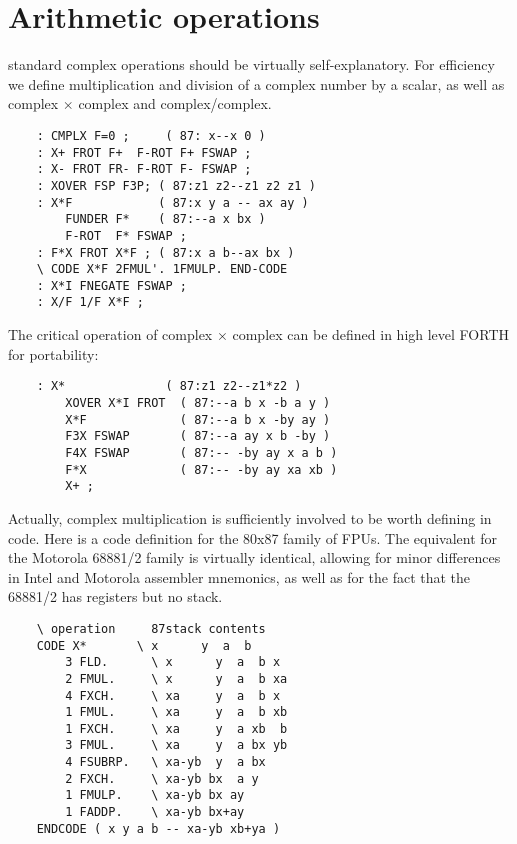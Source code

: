 \section{Arithmetic operations}
 standard complex operations should be virtually self-explanatory. For efficiency we define multiplication and division of a complex number by a scalar, as well as complex $\times$ complex and complex/complex.

\begin{lstlisting}
    : CMPLX F=0 ;     ( 87: x--x 0 )
    : X+ FROT F+  F-ROT F+ FSWAP ;
    : X- FROT FR- F-ROT F- FSWAP ;
    : XOVER FSP F3P; ( 87:z1 z2--z1 z2 z1 )
    : X*F            ( 87:x y a -- ax ay )
        FUNDER F*    ( 87:--a x bx )
        F-ROT  F* FSWAP ;
    : F*X FROT X*F ; ( 87:x a b--ax bx )
    \ CODE X*F 2FMUL'. 1FMULP. END-CODE
    : X*I FNEGATE FSWAP ;
    : X/F 1/F X*F ;
\end{lstlisting}

The critical operation of complex $\times$ complex can be defined in high level FORTH for portability:

\begin{lstlisting}
    : X*              ( 87:z1 z2--z1*z2 )
        XOVER X*I FROT  ( 87:--a b x -b a y )
        X*F             ( 87:--a b x -by ay )
        F3X FSWAP       ( 87:--a ay x b -by )
        F4X FSWAP       ( 87:-- -by ay x a b )
        F*X             ( 87:-- -by ay xa xb )
        X+ ;
\end{lstlisting}

Actually, complex multiplication is sufficiently involved to be worth defining in code. Here is a code definition for the 80x87 family of FPUs. The equivalent for the Motorola 68881/2 family is virtually identical, allowing for minor differences in Intel and Motorola assembler mnemonics, as well as for the fact that the 68881/2 has registers but no stack.

\begin{lstlisting}
    \ operation     87stack contents
    CODE X*       \ x      y  a  b
        3 FLD.      \ x      y  a  b x
        2 FMUL.     \ x      y  a  b xa
        4 FXCH.     \ xa     y  a  b x
        1 FMUL.     \ xa     y  a  b xb
        1 FXCH.     \ xa     y  a xb  b
        3 FMUL.     \ xa     y  a bx yb
        4 FSUBRP.   \ xa-yb  y  a bx
        2 FXCH.     \ xa-yb bx  a y
        1 FMULP.    \ xa-yb bx ay
        1 FADDP.    \ xa-yb bx+ay
    ENDCODE ( x y a b -- xa-yb xb+ya )
\end{lstlisting}

